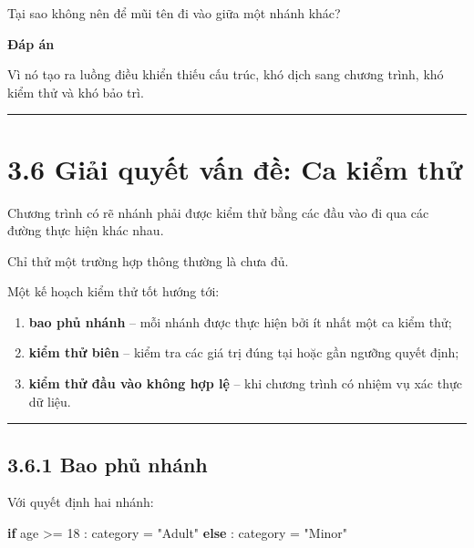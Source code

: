 \documentclass[
  11pt,
  a4paper,
]{article}
\newenvironment{Shaded}{}{}
\newcommand{\ControlFlowTok}[1]{\textcolor[rgb]{0.00,0.44,0.13}{\textbf{#1}}}
\newcommand{\DecValTok}[1]{\textcolor[rgb]{0.25,0.63,0.44}{#1}}
\newcommand{\NormalTok}[1]{#1}
\newcommand{\OperatorTok}[1]{\textcolor[rgb]{0.40,0.40,0.40}{#1}}
\newcommand{\StringTok}[1]{\textcolor[rgb]{0.25,0.44,0.63}{#1}}
\providecommand{\tightlist}{%
  \setlength{\itemsep}{0pt}\setlength{\parskip}{0pt}}
\begin{document}
Tại sao không nên để mũi tên đi vào giữa một nhánh khác?

\textbf{Đáp án}

Vì nó tạo ra luồng điều khiển thiếu cấu trúc, khó dịch sang chương
trình, khó kiểm thử và khó bảo trì.

\begin{center}\rule{0.5\linewidth}{0.5pt}\end{center}

\section{3.6 Giải quyết vấn đề: Ca kiểm
thử}\label{giux1ea3i-quyux1ebft-vux1ea5n-ux111ux1ec1-ca-kiux1ec3m-thux1eed}

Chương trình có rẽ nhánh phải được kiểm thử bằng các đầu vào đi qua các
đường thực hiện khác nhau.

Chỉ thử một trường hợp thông thường là chưa đủ.

Một kế hoạch kiểm thử tốt hướng tới:

\begin{enumerate}
\def\labelenumi{\arabic{enumi}.}
\tightlist
\item
  \textbf{bao phủ nhánh} -- mỗi nhánh được thực hiện bởi ít nhất một ca
  kiểm thử;
\item
  \textbf{kiểm thử biên} -- kiểm tra các giá trị đúng tại hoặc gần
  ngưỡng quyết định;
\item
  \textbf{kiểm thử đầu vào không hợp lệ} -- khi chương trình có nhiệm vụ
  xác thực dữ liệu.
\end{enumerate}

\begin{center}\rule{0.5\linewidth}{0.5pt}\end{center}

\subsection{3.6.1 Bao phủ nhánh}\label{bao-phux1ee7-nhuxe1nh}

Với quyết định hai nhánh:

\begin{Shaded}
\begin{Highlighting}[]
\ControlFlowTok{if}\NormalTok{ age }\OperatorTok{\textgreater{}=} \DecValTok{18}\NormalTok{ :}
\NormalTok{    category }\OperatorTok{=} \StringTok{"Adult"}
\ControlFlowTok{else}\NormalTok{ :}
\NormalTok{    category }\OperatorTok{=} \StringTok{"Minor"}
\end{Highlighting}
\end{Shaded}
\end{document}
